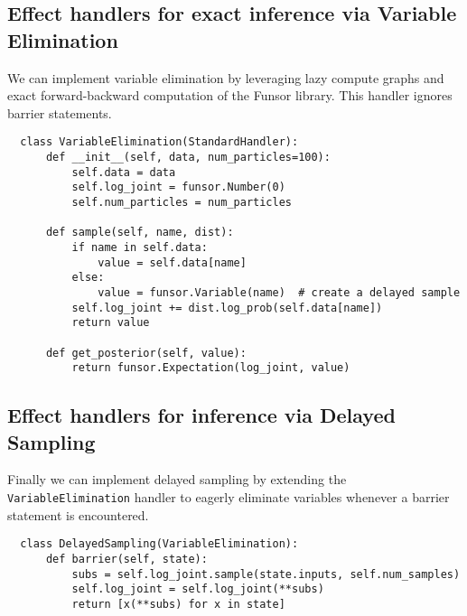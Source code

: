 \documentclass[anonymous=false, %
               format=acmsmall, %
               review=true, %
               screen=true, %
               nonacm=true]{acmart}
\begin{document}
\subsection{Effect handlers for exact inference via Variable Elimination}
We can implement variable elimination by leveraging lazy compute graphs and exact forward-backward computation of the Funsor library.
This handler ignores barrier statements.
\label{sec:appendix:exact}
\begin{verbatim}
  class VariableElimination(StandardHandler):
      def __init__(self, data, num_particles=100):
          self.data = data
          self.log_joint = funsor.Number(0)
          self.num_particles = num_particles

      def sample(self, name, dist):
          if name in self.data:
              value = self.data[name]
          else:
              value = funsor.Variable(name)  # create a delayed sample
          self.log_joint += dist.log_prob(self.data[name])
          return value

      def get_posterior(self, value):
          return funsor.Expectation(log_joint, value)
\end{verbatim}

\subsection{Effect handlers for inference via Delayed Sampling}
Finally we can implement delayed sampling by extending the \verb$VariableElimination$ handler to eagerly eliminate variables whenever a barrier statement is encountered.
\label{sec:appendix:delayed}
\begin{verbatim}
  class DelayedSampling(VariableElimination):
      def barrier(self, state):
          subs = self.log_joint.sample(state.inputs, self.num_samples)
          self.log_joint = self.log_joint(**subs)
          return [x(**subs) for x in state]
\end{verbatim}
\end{document}
